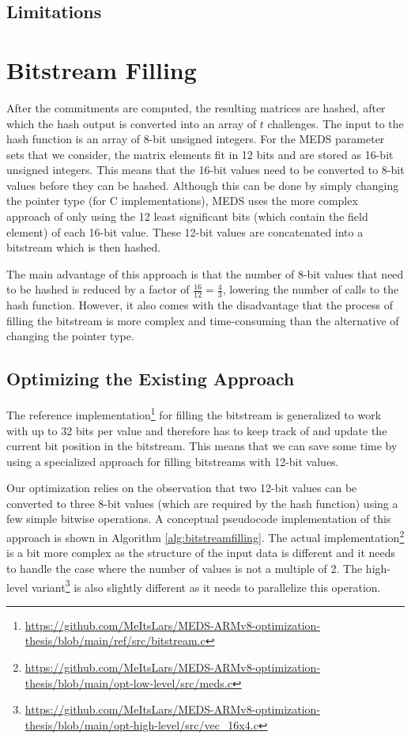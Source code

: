 \documentclass[11pt,a4paper]{report}
\theoremstyle{definition}
\begin{document}
\subsection{Limitations}
\label{sec:highlevellimitations}

\section{Bitstream Filling}
\label{sec:bitstreamfilling}
After the commitments are computed, the resulting matrices are hashed, after which the hash output is converted into an array of $t$ challenges. The input to the hash function is an array of 8-bit unsigned integers. For the MEDS parameter sets that we consider, the matrix elements fit in 12 bits and are stored as 16-bit unsigned integers. This means that the 16-bit values need to be converted to 8-bit values before they can be hashed. Although this can be done by simply changing the pointer type (for C implementations), MEDS uses the more complex approach of only using the 12 least significant bits (which contain the field element) of each 16-bit value. These 12-bit values are concatenated into a bitstream which is then hashed.

The main advantage of this approach is that the number of 8-bit values that need to be hashed is reduced by a factor of $\frac{16}{12} = \frac{4}{3}$, lowering the number of calls to the hash function. However, it also comes with the disadvantage that the process of filling the bitstream is more complex and time-consuming than the alternative of changing the pointer type.

\subsection{Optimizing the Existing Approach}
The reference implementation\footnote{\url{https://github.com/MeItsLars/MEDS-ARMv8-optimization-thesis/blob/main/ref/src/bitstream.c}} for filling the bitstream is generalized to work with up to 32 bits per value and therefore has to keep track of and update the current bit position in the bitstream. This means that we can save some time by using a specialized approach for filling bitstreams with 12-bit values.

Our optimization relies on the observation that two 12-bit values can be converted to three 8-bit values (which are required by the hash function) using a few simple bitwise operations. A conceptual pseudocode implementation of this approach is shown in Algorithm \ref{alg:bitstreamfilling}. The actual implementation\footnote{\url{https://github.com/MeItsLars/MEDS-ARMv8-optimization-thesis/blob/main/opt-low-level/src/meds.c}} is a bit more complex as the structure of the input data is different and it needs to handle the case where the number of values is not a multiple of 2. The high-level variant\footnote{\url{https://github.com/MeItsLars/MEDS-ARMv8-optimization-thesis/blob/main/opt-high-level/src/vec\_16x4.c}} is also slightly different as it needs to parallelize this operation.
\end{document}

